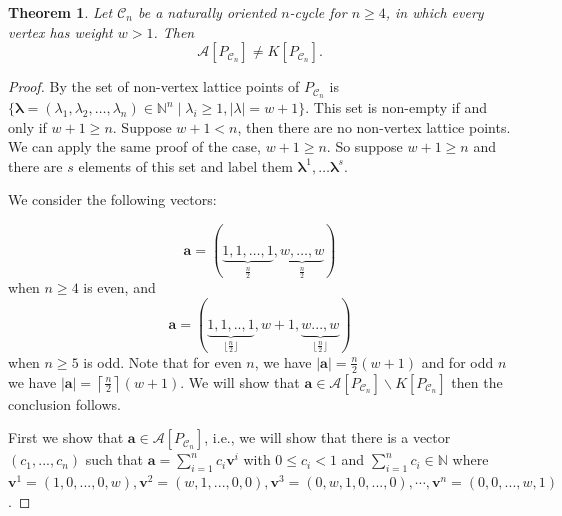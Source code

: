 \documentclass [12pt,a4paper,reqno]{amsart}
\theoremstyle{plain}
\newtheorem{Theorem}{Theorem}[section]
\theoremstyle{definition}
\newtheorem{Assumptions and Discussion}[Theorem]{Assumptions and Discussion}
\theoremstyle{remark}
\def\N{\operatorname{N}} %
\def\N{{\mathbb N}}
\newcommand\bflam{\boldsymbol{\lambda}}
\newcommand\calA{\mathcal{A}}
\newcommand\calC{\mathcal{C}}
\begin{document}
\begin{Theorem}
\label{cycleSameOrientation} Let $\mathcal{C}_n$ be a naturally oriented $n$-cycle for $n\geq 4$, in which every vertex has weight $w>1$. Then
\[
\mathcal{A}[P_{\calC_n}] \ne K[P_{\calC_n}].
\]
\end{Theorem}

\begin{proof}
By  the set of non-vertex lattice points of $P_{\calC_n}$ is $\{ \bflam = (\lambda_1, \lambda_2, \dots, \lambda_n) \in \mathbb{N}^n \mid \lambda_i \geq 1, |\lambda| = w+1\}$.  This set is non-empty if and only if $w+1 \geq n$. Suppose $w+1<n$, then there are no non-vertex lattice points. We can
apply the same proof of the case, $w+1 \geq n$.  So suppose $w+1 \geq n$ and there are $s$ elements of this set and label them $\bflam^1, \dots \bflam^s$.


We consider the following vectors:

\[
\mathbf{a}=(\underbrace{1,1,\dots,1}_{\frac{n}{2}},\underbrace{w,\dots,w}_{\frac{n}{2}})
\]
when $n\geq 4$ is even, and 
\[
\mathbf{a}  =(\underbrace{1,1,..,1}_{\lfloor \frac{n}{2}\rfloor},w+1,\underbrace{w...,w}_{\lfloor \frac{n}{2} \rfloor})
\]
when $n\geq 5$ is odd.  
Note that for even $n$, we have $|\mathbf{a}|=\frac{n}{2}(w+1)$ and for odd $n$ we have $|\mathbf{a}|=\left\lceil \frac{n}{2}\right\rceil (w+1)$. We will show that $\mathbf{a}\in \calA[P_{\calC_{n}}]\backslash K[P_{\calC_{n}}]$ then the conclusion follows.

First we show that $\mathbf{a}\in \calA[P_{\calC_{n}}]$, i.e.,  we will show that there is a vector $(c_{1},...,c_{n})$ such that $\mathbf{a}=\sum_{i=1}^{n}c_{i}\mathbf{v}^{i}$
with $0\leq c_{i}<1$ and $\sum_{i=1}^n c_i \in \N$ where $\mathbf{v}^{1}=(1,0,...,0,w), \mathbf{v}^{2}=(w,1,...,0,0),\mathbf{v}^{3}=(0,w,1,0,...,0),\cdots,\mathbf{v}^{n}=(0,0,...,w,1)$.




\end{proof}
\end{document}

